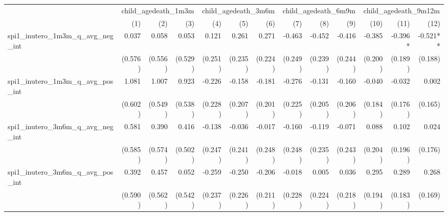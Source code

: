 \begin{tabular}{lrrrrrrrrrrrr}
\toprule
                                            &  \multicolumn{3}{c}{child\_agedeath\_1m3m} &  \multicolumn{3}{c}{child\_agedeath\_3m6m} &  \multicolumn{3}{c}{child\_agedeath\_6m9m} & \multicolumn{3}{c}{child\_agedeath\_9m12m} \\ 
\cmidrule(lr){2-4} \cmidrule(lr){5-7} \cmidrule(lr){8-10} \cmidrule(lr){11-13} 
                                            &          (1) &          (2) &          (3) &          (4) &          (5) &          (6) &          (7) &          (8) &          (9) &         (10) &         (11) &         (12) \\ 
\midrule
spi1\_inutero\_1m3m\_q\_avg\_neg\_int       &        0.037 &        0.058 &        0.053 &        0.121 &        0.261 &        0.271 &       -0.463 &       -0.452 &       -0.416 &       -0.385 &      -0.396* &     -0.521** \\ 
                                            &      (0.576) &      (0.556) &      (0.529) &      (0.251) &      (0.235) &      (0.224) &      (0.249) &      (0.239) &      (0.244) &      (0.200) &      (0.189) &      (0.188) \\ 
spi1\_inutero\_1m3m\_q\_avg\_pos\_int       &        1.081 &        1.007 &        0.923 &       -0.226 &       -0.158 &       -0.181 &       -0.276 &       -0.131 &       -0.160 &       -0.040 &       -0.032 &        0.002 \\ 
                                            &      (0.602) &      (0.549) &      (0.538) &      (0.228) &      (0.207) &      (0.201) &      (0.225) &      (0.205) &      (0.206) &      (0.184) &      (0.176) &      (0.165) \\ 
spi1\_inutero\_3m6m\_q\_avg\_neg\_int       &        0.581 &        0.390 &        0.416 &       -0.138 &       -0.036 &       -0.017 &       -0.160 &       -0.119 &       -0.071 &        0.088 &        0.102 &        0.024 \\ 
                                            &      (0.585) &      (0.574) &      (0.502) &      (0.247) &      (0.241) &      (0.248) &      (0.248) &      (0.235) &      (0.243) &      (0.204) &      (0.196) &      (0.176) \\ 
spi1\_inutero\_3m6m\_q\_avg\_pos\_int       &        0.392 &        0.457 &        0.052 &       -0.259 &       -0.250 &       -0.206 &       -0.018 &        0.005 &        0.036 &        0.295 &        0.289 &        0.268 \\ 
                                            &      (0.590) &      (0.562) &      (0.542) &      (0.237) &      (0.226) &      (0.211) &      (0.228) &      (0.224) &      (0.218) &      (0.194) &      (0.183) &      (0.169) \\ 

\end{tabular}
